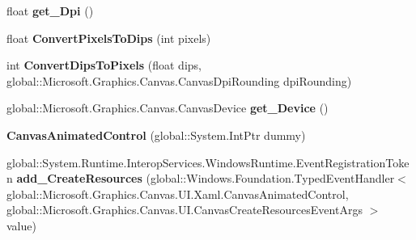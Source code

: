 \begin{DoxyCompactItemize}
float {\bfseries get\+\_\+\+Dpi} ()
\item 
\mbox{\label{class_microsoft_1_1_graphics_1_1_canvas_1_1_u_i_1_1_xaml_1_1_canvas_animated_control_ab0b1da0cf267c685934b92f346cce7cf}} 
float {\bfseries Convert\+Pixels\+To\+Dips} (int pixels)
\item 
\mbox{\label{class_microsoft_1_1_graphics_1_1_canvas_1_1_u_i_1_1_xaml_1_1_canvas_animated_control_aa34dd27c9c4151d704bfb1983c806c32}} 
int {\bfseries Convert\+Dips\+To\+Pixels} (float dips, global\+::\+Microsoft.\+Graphics.\+Canvas.\+Canvas\+Dpi\+Rounding dpi\+Rounding)
\item 
\mbox{\label{class_microsoft_1_1_graphics_1_1_canvas_1_1_u_i_1_1_xaml_1_1_canvas_animated_control_aec535e07f21ffa8f46615d610ebefa92}} 
global\+::\+Microsoft.\+Graphics.\+Canvas.\+Canvas\+Device {\bfseries get\+\_\+\+Device} ()
\item 
\mbox{\label{class_microsoft_1_1_graphics_1_1_canvas_1_1_u_i_1_1_xaml_1_1_canvas_animated_control_a8981d0bd18a97c22dbdf7422dc124959}} 
{\bfseries Canvas\+Animated\+Control} (global\+::\+System.\+Int\+Ptr dummy)
\item 
\mbox{\label{class_microsoft_1_1_graphics_1_1_canvas_1_1_u_i_1_1_xaml_1_1_canvas_animated_control_a625047d0ad176bc76c1686e025f4ee53}} 
global\+::\+System.\+Runtime.\+Interop\+Services.\+Windows\+Runtime.\+Event\+Registration\+Token {\bfseries add\+\_\+\+Create\+Resources} (global\+::\+Windows.\+Foundation.\+Typed\+Event\+Handler$<$ global\+::\+Microsoft.\+Graphics.\+Canvas.\+U\+I.\+Xaml.\+Canvas\+Animated\+Control, global\+::\+Microsoft.\+Graphics.\+Canvas.\+U\+I.\+Canvas\+Create\+Resources\+Event\+Args $>$ value)
\item 
\mbox{\label{class_microsoft_1_1_graphics_1_1_canvas_1_1_u_i_1_1_xaml_1_1_canvas_animated_control_a44a43d134b2c41ea2ec6eddf26aadd31}} 

\end{DoxyCompactItemize}
